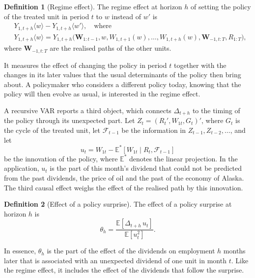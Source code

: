 \documentclass[12pt,a4paper]{article}
\theoremstyle{definition}
\theoremstyle{definition}\newtheorem{example}{Example}
\theoremstyle{definition}\newtheorem{definition}{Definition}
\newcommand{\E}{\mathbb{E}}
\begin{document}
\begin{definition}[Regime effect\label{def:regime}]
The regime effect at horizon $h$ of setting the policy of the treated unit in period $t$ to $w$ instead of $w'$ is
\begin{equation}
\begin{split}
&Y_{1,t+h}\langle w\rangle-Y_{1,t+h}\langle w'\rangle,\quad\text{where}\\
&Y_{1,t+h}\langle w\rangle=Y_{1,t+h}\big(\mathbf{W}_{1:t-1},w,W_{1,t+1}(w),\dots,W_{1,t+h}(w),\mathbf{W}_{-1,t:T},R_{1:T}\big),
\end{split}
\label{eq:regime}
\end{equation}
where $\mathbf{W}_{-1,t:T}$ are the realised paths of the other units.
\end{definition}

It measures the effect of changing the policy in period $t$ together with the changes in its later values that the usual determinants of the policy then bring about. A policymaker who considers a different policy today, knowing that the policy will then evolve as usual, is interested in the regime effect.

A recursive VAR reports a third object, which connects $\Delta_{t+h}$ to the timing of the policy through its unexpected part. Let $Z_t=(R_t',W_{1t},G_t)'$, where $G_t$ is the cycle of the treated unit, let $\mathcal{F}_{t-1}$ be the information in $Z_{t-1},Z_{t-2},\dots$, and let
\begin{equation}
u_t=W_{1t}-\E^\ast[W_{1t}\mid R_t,\mathcal{F}_{t-1}]
\label{eq:innovation}
\end{equation}
be the innovation of the policy, where $\E^\ast$ denotes the linear projection. In the application, $u_t$ is the part of this month's dividend that could not be predicted from the past dividends, the price of oil and the past of the economy of Alaska. The third causal effect weighs the effect of the realised path by this innovation.

\begin{definition}[Effect of a policy surprise\label{def:surprise}]
The effect of a policy surprise at horizon $h$ is
\begin{equation}
\theta_h=\frac{\E[\Delta_{t+h}\,u_t]}{\E[u_t^2]}.
\label{eq:estimand}
\end{equation}
\end{definition}

In essence, $\theta_h$ is the part of the effect of the dividends on employment $h$ months later that is associated with an unexpected dividend of one unit in month $t$. Like the regime effect, it includes the effect of the dividends that follow the surprise. 
\end{document}
